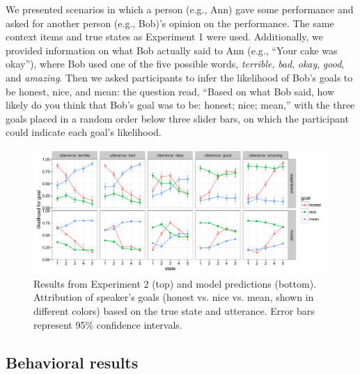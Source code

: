 \documentclass[10pt,letterpaper]{article}
\begin{document}
We presented scenarios in which a person (e.g., Ann) gave some performance and asked for another person (e.g., Bob)'s opinion on the performance. The same context items and true states as Experiment 1 were used. Additionally, we provided information on what Bob actually said to Ann (e.g., ``Your cake was okay''), where Bob used one of the five possible words,  \emph{terrible}, \emph{bad}, \emph{okay}, \emph{good}, and \emph{amazing}. Then we asked participants to infer the likelihood of Bob's goals to be honest, nice, and mean: the question read, ``Based on what Bob said, how likely do you think that Bob's goal was to be: honest; nice; mean,'' with the three goals placed in a random order below three slider bars, on which the participant could indicate each goal's likelihood.

\begin{figure}[t]
\begin{center} 
  \includegraphics[width=.9\textwidth]{figures/exp2.pdf}
  \caption{\label{fig:exp2} Results from Experiment 2 (top) and model predictions (bottom). Attribution of speaker's goals (honest vs. nice vs. mean, shown in different colors) based on the true state and utterance. Error bars represent 95\% confidence intervals.}
  \end{center} 
\end{figure}

\subsection{Behavioral results}
\end{document}
